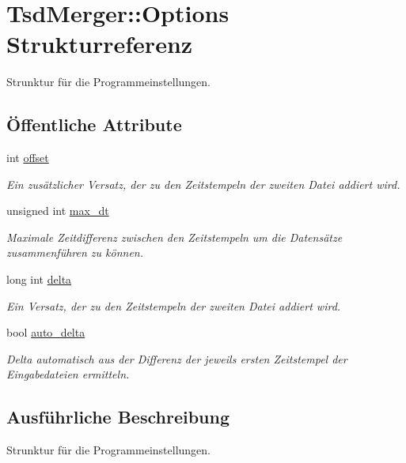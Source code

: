 \hypertarget{structTsdMerger_1_1Options}{\section{Tsd\-Merger\-:\-:Options Strukturreferenz}
\label{structTsdMerger_1_1Options}
}


Strunktur für die Programmeinstellungen.  


\subsection*{Öffentliche Attribute}
\begin{DoxyCompactItemize}
\item 
int \hyperlink{structTsdMerger_1_1Options_a01b3881ab882a6ec9690220bef2207b8}{offset}
\begin{DoxyCompactList}\small\item\em Ein zusätzlicher Versatz, der zu den Zeitstempeln der zweiten Datei addiert wird. \end{DoxyCompactList}\item 
unsigned int \hyperlink{structTsdMerger_1_1Options_aa8403cbade9ca78ab6f5be07ad270c15}{max\-\_\-dt}
\begin{DoxyCompactList}\small\item\em Maximale Zeitdifferenz zwischen den Zeitstempeln um die Datensätze zusammenführen zu können. \end{DoxyCompactList}\item 
long int \hyperlink{structTsdMerger_1_1Options_ac64f16f7048749aceb1f3368344ea8a8}{delta}
\begin{DoxyCompactList}\small\item\em Ein Versatz, der zu den Zeitstempeln der zweiten Datei addiert wird. \end{DoxyCompactList}\item 
bool \hyperlink{structTsdMerger_1_1Options_a34cacae19241161f15637c7fcab5ac0a}{auto\-\_\-delta}
\begin{DoxyCompactList}\small\item\em Delta automatisch aus der Differenz der jeweils ersten Zeitstempel der Eingabedateien ermitteln. \end{DoxyCompactList}\end{DoxyCompactItemize}


\subsection{Ausführliche Beschreibung}
Strunktur für die Programmeinstellungen. 

